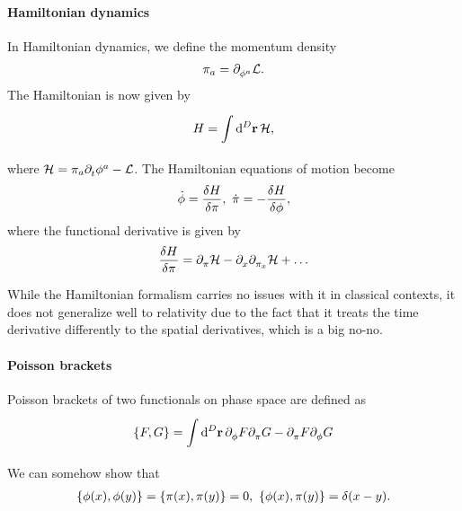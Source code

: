 \paragraph{Hamiltonian dynamics}
In Hamiltonian dynamics, we define the momentum density
\begin{align*}
	\pi_{a} = \partial^{}_{\phi^{a}}\mathcal{L}.
\end{align*}
The Hamiltonian is now given by
\begin{align*}
	H = \int\limits_{}^{}\dd[D]{\vb{r}}\mathcal{H},
\end{align*}
where $\mathcal{H} = \pi_{a}\partial^{}_{t}\phi^{a} - \mathcal{L}$. The Hamiltonian equations of motion become
\begin{align*}
	\dot{\phi} = \fdv{H}{\pi},\ \dot{\pi} = -\fdv{H}{\phi},
\end{align*}
where the functional derivative is given by
\begin{align*}
	\fdv{H}{\pi} = \del{\pi}{\ham} - \del{x}{\del{\pi_{x}}{\ham}} + \dots
\end{align*}

While the Hamiltonian formalism carries no issues with it in classical contexts, it does not generalize well to relativity due to the fact that it treats the time derivative differently to the spatial derivatives, which is a big no-no.

\paragraph{Poisson brackets}
Poisson brackets of two functionals on phase space are defined as
\begin{align*}
	\left\{F, G\right\} = \int\limits_{}^{}\dd[D]{\vb{r}}\partial^{}_{\phi}F\partial^{}_{\pi}G - \partial^{}_{\pi}F\partial^{}_{\phi}G
\end{align*}
We can somehow show that
\begin{align*}
	\pob{\phi(x)}{\phi(y)} = \pob{\pi(x)}{\pi(y)} = 0,\ \pob{\phi(x)}{\pi(y)} = \delta(x - y).
\end{align*}